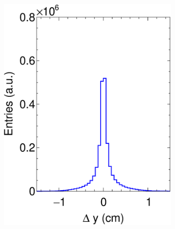 \begin{figure}[t]
\begin{subfigure}[b]{0.32\textwidth}
         \includegraphics[width=\textwidth]{figures/ch5-KF_NDGAr/FullSample/Int/Props/ResY.eps}
         \caption{}
         \label{fig:TPCYRes_Int}
     \end{subfigure}
          \begin{subfigure}[b]{0.32\textwidth}
         \centering

\end{subfigure}
\end{figure}
